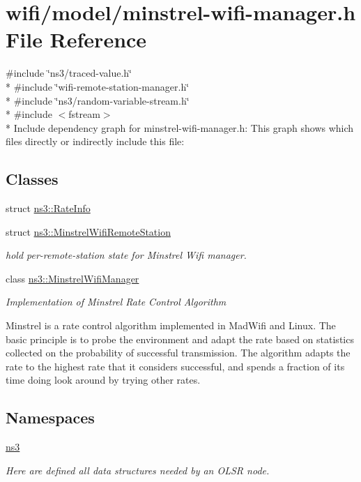 \hypertarget{minstrel-wifi-manager_8h}{}\section{wifi/model/minstrel-\/wifi-\/manager.h File Reference}
\label{minstrel-wifi-manager_8h}
{\ttfamily \#include \char`\"{}ns3/traced-\/value.\+h\char`\"{}}\\*
{\ttfamily \#include \char`\"{}wifi-\/remote-\/station-\/manager.\+h\char`\"{}}\\*
{\ttfamily \#include \char`\"{}ns3/random-\/variable-\/stream.\+h\char`\"{}}\\*
{\ttfamily \#include $<$fstream$>$}\\*
Include dependency graph for minstrel-\/wifi-\/manager.h\+:
This graph shows which files directly or indirectly include this file\+:
\subsection*{Classes}
\begin{DoxyCompactItemize}
\item 
struct \hyperlink{structns3_1_1RateInfo}{ns3\+::\+Rate\+Info}
\item 
struct \hyperlink{structns3_1_1MinstrelWifiRemoteStation}{ns3\+::\+Minstrel\+Wifi\+Remote\+Station}
\begin{DoxyCompactList}\small\item\em hold per-\/remote-\/station state for Minstrel Wifi manager. \end{DoxyCompactList}\item 
class \hyperlink{classns3_1_1MinstrelWifiManager}{ns3\+::\+Minstrel\+Wifi\+Manager}
\begin{DoxyCompactList}\small\item\em Implementation of Minstrel Rate Control Algorithm

Minstrel is a rate control algorithm implemented in Mad\+Wifi and Linux. The basic principle is to probe the environment and adapt the rate based on statistics collected on the probability of successful transmission. The algorithm adapts the rate to the highest rate that it considers successful, and spends a fraction of its time doing \textquotesingle{}look around\textquotesingle{} by trying other rates. \end{DoxyCompactList}\end{DoxyCompactItemize}
\subsection*{Namespaces}
\begin{DoxyCompactItemize}
\item 
 \hyperlink{namespacens3}{ns3}
\begin{DoxyCompactList}\small\item\em Here are defined all data structures needed by an O\+L\+SR node. \end{DoxyCompactList}\end{DoxyCompactItemize}
